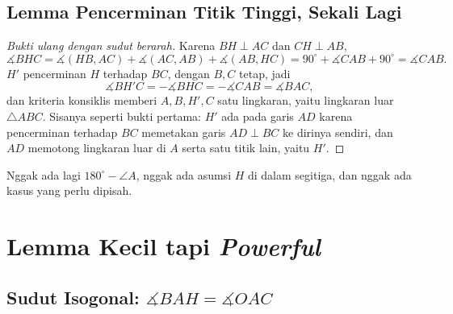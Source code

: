\documentclass[letterpaper, 13pt]{scrartcl}
\begin{document}
\subsection{Lemma Pencerminan Titik Tinggi, Sekali Lagi}

\begin{proof}[Bukti ulang dengan sudut berarah]
Karena $BH \perp AC$ dan $CH \perp AB$,
\[
\measuredangle BHC = \measuredangle(HB, AC) + \measuredangle(AC, AB) + \measuredangle(AB, HC)
        = 90^\circ + \measuredangle CAB + 90^\circ = \measuredangle CAB.
\]
$H'$ pencerminan $H$ terhadap $BC$, dengan $B, C$ tetap, jadi
\[
\measuredangle BH'C = -\measuredangle BHC = -\measuredangle CAB = \measuredangle BAC,
\]
dan kriteria konsiklis memberi $A, B, H', C$ satu lingkaran, yaitu lingkaran luar $\triangle ABC$. Sisanya seperti bukti pertama: $H'$ ada pada garis $AD$ karena pencerminan terhadap $BC$ memetakan garis $AD \perp BC$ ke dirinya sendiri, dan $AD$ memotong lingkaran luar di $A$ serta satu titik lain, yaitu $H'$.
\end{proof}

Nggak ada lagi $180^\circ - \angle A$, nggak ada asumsi $H$ di dalam segitiga, dan nggak ada kasus yang perlu dipisah.

\section{Lemma Kecil tapi \textit{Powerful}}
\subsection{Sudut Isogonal: $\measuredangle BAH = \measuredangle OAC$}
\end{document}
